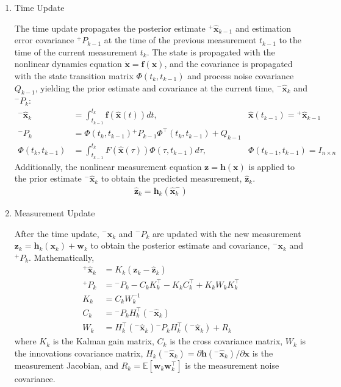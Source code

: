 \documentclass[letterpaper, preprint, paper,11pt]{AAS}	%
\newcommand{\E}{\mathbb{E}}
\begin{document}
\begin{enumerate}
    \item Time Update
    
    The time update propagates the posterior estimate ${}^+\hat{\bm{x}}_{k-1}$ and estimation error covariance ${}^+P_{k-1}$ at the time of the previous measurement $t_{k-1}$ to the time of the current measurement $t_k$. The state is propagated with the nonlinear dynamics equation $\dot{\bm{x}} = \bm{f}(\bm{x})$, and the covariance is propagated with the state transition matrix $\Phi(t_k, t_{k-1})$ and process noise covariance $Q_{k-1}$, yielding the prior estimate and covariance at the current time, ${}^-\bm{\hat{x}}_k$ and ${}^-P_k$:
    \begin{align}
        {}^-\hat{\bm{x}}_k &= \int_{t_{k-1}}^{t_k} \bm{f}(\bm{\hat{x}}(t)) dt, & \hat{\bm{x}}(t_{k-1}) = {}^+\hat{\bm{x}}_{k-1} \label{nonlinear estimate propagation (first EKF equation)} \\
        {}^-P_k &= \Phi(t_k, t_{k-1}) {}^+P_{k-1} \Phi^\top(t_k, t_{k-1}) + Q_{k-1}\\
        \Phi(t_k, t_{k-1}) &= \int_{t_{k-1}}^{t_k} F(\hat{\bm{x}}(\tau))\Phi(\tau, t_{k-1}) d\tau, & \Phi(t_{k-1}, t_{k-1}) = I_{n\times n} \label{eq:STM-propagation}
    \end{align}
    Additionally, the nonlinear measurement equation $\bm{z} = \bm{h}(\bm{x})$ is applied to the prior estimate ${}^-\hat{\bm{x}}_k$ to obtain the predicted measurement, $\bm{\hat{z}}_k$.
    \begin{align}
        \bm{\hat{z}}_k = \bm{h}_k(\bm{\hat{x}}_k^-) \label{eq:predicted measurement}
    \end{align}

    \item Measurement Update
    
    After the time update, ${}^-\bm{\hat{x}}_k$ and ${}^-P_k$ are updated with the new measurement $\bm{z}_k = \bm{h}_k(\bm{x}_k) + \bm{w}_k$ to obtain the posterior estimate and covariance, ${}^-\bm{x}_k$ and ${}^+P_k$. Mathematically,
    \begin{align}
        ^+\bm{\hat{x}}_k &= K_k (\bm{z}_k - \bm{\hat{z}}_k) \label{eq:posterior-estimate-update}\\
        ^+P_k &= {}^-P_k - C_k K_k^\top - K_k C_k ^\top + K_k W_k K_k^\top \\
        K_k &= C_k W_k^{-1} \\
        C_k &= {}^-P_k H_k^\top({}^-\bm{\hat{x}}_k) \\
        W_k &= H_k^\top({}^-\bm{\hat{x}}_k) {}^-P_k H_k^\top({}^-\bm{\hat{x}}_k) + R_k \label{eq:innovations covariance (last EKF eq)}
    \end{align}
    \noindent where $K_k$ is the Kalman gain matrix, $C_k$ is the cross covariance matrix, $W_k$ is the innovations covariance matrix, $H_k({}^-\bm{\hat{x}}_k) = \partial \bm{h}({}^-\hat{\bm{x}}_k)/\partial\bm{x}$ is the measurement Jacobian, and $R_k = \E[\bm{w}_k\bm{w}_k^\top]$ is the measurement noise covariance.

\end{enumerate}
\end{document}
